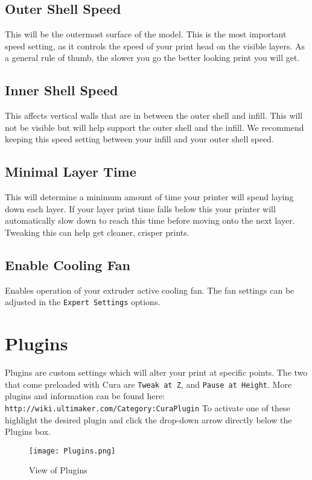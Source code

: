 \subsection{Outer Shell Speed}
This will be the outermost surface of the model. This is the most important speed setting, as it controls the speed of your print head on the visible layers. As a general rule of thumb, the slower you go the better looking print you will get. 

\subsection{Inner Shell Speed}
This affects vertical walls that are in between the outer shell and infill. This will not be visible but will help support the outer shell and the infill. We recommend keeping this speed setting between your infill and your outer shell speed.

\subsection{Minimal Layer Time}
This will determine a minimum amount of time your printer will spend laying down each layer. If your layer print time falls below this your printer will automatically slow down to reach this time before moving onto the next layer. Tweaking this can help get cleaner, crisper prints.

\subsection{Enable Cooling Fan}
Enables operation of your extruder active cooling fan. The fan settings can be adjusted in the \texttt{Expert Settings} options.

\section{Plugins}
Plugins are custom settings which will alter your print at specific points. The two that come preloaded with Cura are \texttt{Tweak at Z}, and \texttt{Pause at Height}. More plugins and information can be found here: \texttt{http://wiki.ultimaker.com/Category:CuraPlugin} To activate one of these highlight the desired plugin and click the drop-down arrow directly below the Plugins box. 
\begin{figure}[H]
\centering
\texttt{[image: Plugins.png]}
\caption{View of Plugins}
\label{fig:Plugins}
\end{figure}

